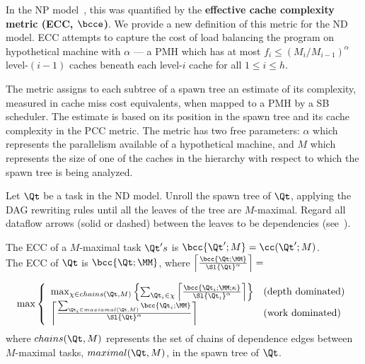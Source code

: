 In the NP model~\cite[Defn. 3]{BlellochFiGi11}, this was quantified by
the {\bf effective cache complexity metric (ECC, $\bcce$)}. We provide
a new definition of this metric for the ND model.  ECC attempts to
capture the cost of load balancing the program on hypothetical machine
with  $\alpha$ --- a PMH which
has at most $f_i \le (M_i/M_{i-1})^\alpha$ level-$(i-1)$ caches
beneath each level-$i$ cache for all $1\le i\le h$.

The metric assigns to each subtree of a spawn tree an estimate of its
complexity, measured in cache miss cost equivalents, when mapped to a
PMH by a SB scheduler. The estimate is based on its position in the
spawn tree and its cache complexity in the PCC metric. The metric has
two free parameters: $\alpha$ which represents the parallelism
available of a hypothetical machine, and $M$ which represents the size
of one of the caches in the hierarchy with respect to which the spawn
tree is being analyzed.

\begin{definition}
\label{def:qhat-fire}

Let $\Qt$ be a task in the ND model.  Unroll the spawn tree of $\Qt$,
applying the DAG rewriting rules until all the leaves of the tree are
$M$-maximal. Regard all dataflow arrows (solid or dashed) between the
leaves to be dependencies (see~).

\noindent The ECC of a $M$-maximal task $\Qt's$ is
 $\bcc{\Qt';M} = \cc(\Qt';M)$.\\

\noindent The ECC of $\Qt$ is  $\bcc{\Qt;\MM}$, where
  $\left\lceil\frac{\bcc{\Qt;\MM}}{\Sl{\Qt}^\alpha}\right\rceil = $

\begin{eqnarray*}
\max\left\{ 
\begin{array}{lll}
 \max_{\chi \in chains(\Qt,M)}
\left\{ 
\sum_{\Qt_i\in\chi}
\left\lceil\frac{\bcc{\Qt_i;\MM;\kappa}}{\Sl{\Qt_i}^\alpha}\right\rceil
\right\}
 & \mbox{(depth dominated)}\\
\left\lceil\frac{\sum_{\Qt_i\in maxiamal(\Qt,M)} \bcc{\Qt_i;\MM}}{\Sl{\Qt}^\alpha}\right\rceil
 & \mbox{(work dominated)}
\end{array}
\right.
\end{eqnarray*}
where $chains(\Qt,M)$ represents the set of chains of dependence edges
between $M$-maximal tasks, $maximal(\Qt,M)$, in the spawn tree of $\Qt$.
\end{definition}

